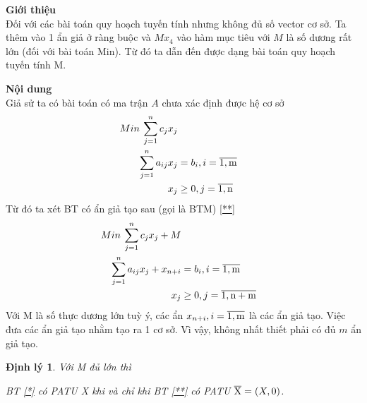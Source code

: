 \documentclass{article}
\newtheorem{dl}{Định lý}
\begin{document}
                \begin{enumerate}
                    \item \textbf{Giới thiệu} \\
                        Đối với các bài toán quy hoạch tuyến tính nhưng không đủ số vector cơ sở. Ta thêm vào 1 ẩn giả ở ràng buộc và $Mx_4$ vào hàm mục tiêu với $M$ là số dương rất lớn (đối với bài toán Min). Từ đó ta dẫn đến được dạng bài toán quy hoạch tuyến tính M.
                    \item \textbf{Nội dung} \\
                        Giả sử ta có bài toán có ma trận $A$ chưa xác định được hệ cơ sở
                            \begin{equation} \label{*}
                                \begin{split}
                                    Min \: \sum_{j=1}^n c_jx_j \\
                                    \sum_{j=1}^n a_{ij}x_j&=b_i , i = \overline{\rm 1,m} \\
                                    x_j &\geq 0 , j = \overline{\rm 1,n} \\
                                \end{split}
                            \end{equation}
                        Từ đó ta xét BT có ẩn giả tạo sau (gọi là BTM) \eqref{**}
                            \begin{equation} \label{**}
                                \begin{split}
                                    Min \: \sum_{j=1}^n c_jx_j+M \\
                                    \sum_{j=1}^n a_{ij}x_j + x_{n+i}&=b_i , i = \overline{\rm 1,m} \\
                                    x_j &\geq 0 , j= \overline{\rm 1,{n+m}}
                                \end{split}
                            \end{equation}
                        Với M là số thực dương lớn tuỳ ý, các ẩn $x_{n+i} , i=\overline{\rm 1,m}$ là các ẩn giả tạo. Việc đưa các ẩn giả tạo nhằm tạo ra 1 cơ sở. Vì vậy, không nhất thiết phải có đủ $m$ ẩn giả tạo.
                            \begin{dl}
                                Với M đủ lớn thì
                                \item BT \eqref{*}  có PATU X khi và chỉ khi BT \eqref{**} có PATU $\overline{\rm X} = (X,0)$.

\end{dl}
\end{enumerate}
\end{document}
